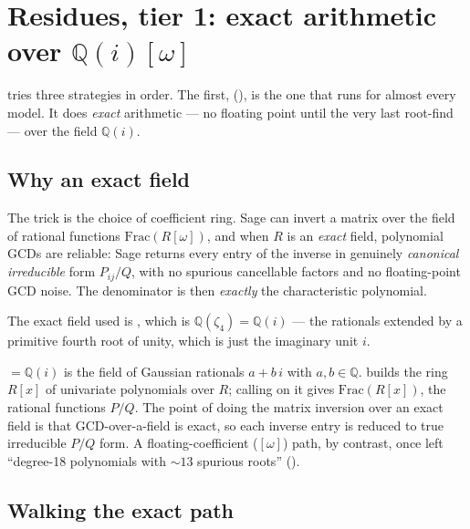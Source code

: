 \section{Residues, tier 1: exact arithmetic over \texorpdfstring{$\mathbb{Q}(i)[\omega]$}{Q(i)}}

 tries three strategies in order. The first,
(), is the one that runs for almost every
model. It does \emph{exact} arithmetic --- no floating point until the very last
root-find --- over the field $\mathbb{Q}(i)$.

\subsection{Why an exact field}

The trick is the choice of coefficient ring. Sage can invert a matrix over the
field of rational functions $\mathrm{Frac}(R[\omega])$, and when $R$ is an
\emph{exact} field, polynomial GCDs are reliable: Sage returns every entry of the
inverse in genuinely \emph{canonical irreducible} form $P_{ij}/Q$, with no
spurious cancellable factors and no floating-point GCD noise. The denominator is
then \emph{exactly} the characteristic polynomial.

The exact field used is , which is
$\mathbb{Q}(\zeta_4) = \mathbb{Q}(i)$ --- the rationals extended by a primitive
fourth root of unity, which is just the imaginary unit $i$.

\begin{defn}
 $= \mathbb{Q}(i)$ is the field of Gaussian
rationals $a + b\,i$ with $a, b \in \mathbb{Q}$. 
builds the ring $R[x]$ of univariate polynomials over $R$; calling
 on it gives $\mathrm{Frac}(R[x])$, the rational
functions $P/Q$. The point of doing the matrix inversion over an exact field is
that GCD-over-a-field is exact, so each inverse entry is reduced to true
irreducible $P/Q$ form. A floating-coefficient ($[\omega]$) path, by
contrast, once left ``degree-18 polynomials with $\sim13$ spurious roots''
().
\end{defn}

\subsection{Walking the exact path}

